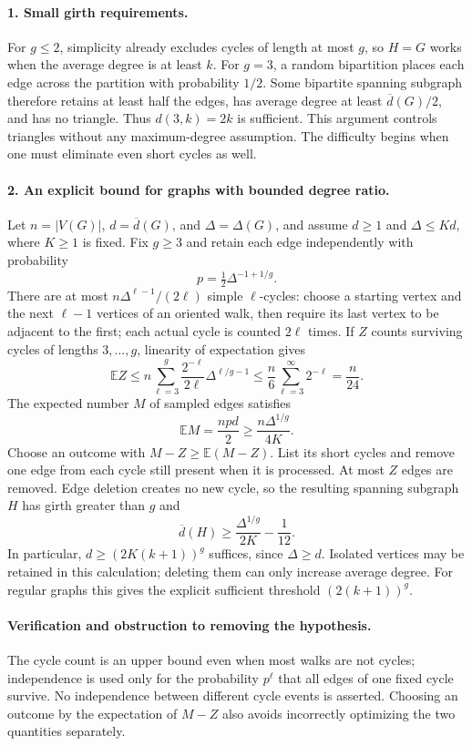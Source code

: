 \documentclass[11pt,a4paper]{article}
\begin{document}
\paragraph{1. Small girth requirements.}
For $g\le2$, simplicity already excludes cycles of length at most $g$,
so $H=G$ works when the average degree is at least $k$. For $g=3$,
a random bipartition places each edge across the partition with
probability $1/2$. Some bipartite spanning subgraph therefore retains
at least half the edges, has average degree at least
$\overline d(G)/2$, and has no triangle. Thus $d(3,k)=2k$ is sufficient.
This argument controls triangles without any maximum-degree assumption.
The difficulty begins when one must eliminate even short cycles as well.

\paragraph{2. An explicit bound for graphs with bounded degree ratio.}
Let $n=|V(G)|$, $d=\overline d(G)$, and $\Delta=\Delta(G)$, and
assume $d\ge1$ and $\Delta\le Kd$, where $K\ge1$ is fixed. Fix
$g\ge3$ and retain each edge independently with probability
\[
 p=\tfrac12\Delta^{-1+1/g}.
\]
There are at most $n\Delta^{\ell-1}/(2\ell)$ simple $\ell$-cycles:
choose a starting vertex and the next $\ell-1$ vertices of an oriented
walk, then require its last vertex to be adjacent to the first;
each actual cycle is counted $2\ell$ times. If $Z$ counts surviving
cycles of lengths $3,\ldots,g$, linearity of expectation gives
\[
 \mathbb E Z\le n\sum_{\ell=3}^g
 \frac{2^{-\ell}}{2\ell}\Delta^{\ell/g-1}
 \le \frac n6\sum_{\ell=3}^{\infty}2^{-\ell}=\frac n{24}.
\]
The expected number $M$ of sampled edges satisfies
\[
 \mathbb E M=\frac{npd}{2}
 \ge\frac{n\Delta^{1/g}}{4K}.
\]
Choose an outcome with $M-Z\ge\mathbb E(M-Z)$. List its short
cycles and remove one edge from each cycle still present when it is
processed. At most $Z$ edges are removed. Edge deletion creates no
new cycle, so the resulting spanning subgraph $H$ has girth greater
than $g$ and
\[
 \overline d(H)\ge\frac{\Delta^{1/g}}{2K}-\frac1{12}.
\]
In particular, $d\ge(2K(k+1))^g$ suffices, since $\Delta\ge d$.
Isolated vertices may be retained in this calculation; deleting them
can only increase average degree. For regular graphs this gives the
explicit sufficient threshold $(2(k+1))^g$.

\paragraph{Verification and obstruction to removing the hypothesis.}
The cycle count is an upper bound even when most walks are not cycles;
independence is used only for the probability $p^\ell$ that all edges
of one fixed cycle survive. No independence between different cycle
events is asserted. Choosing an outcome by the expectation of $M-Z$
also avoids incorrectly optimizing the two quantities separately.
\end{document}
